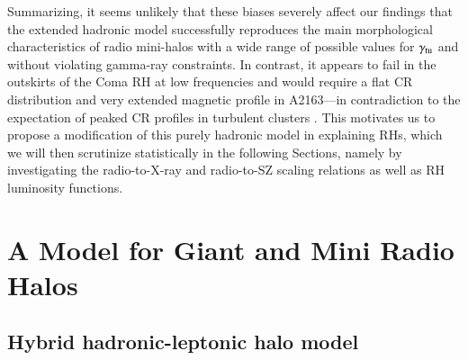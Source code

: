 \documentclass[useAMS,usenatbib]{mn2e}
\def\del#1{{}}
\begin{document}
Summarizing, it seems unlikely that these biases severely affect our findings
that the extended hadronic model successfully reproduces the main morphological
characteristics of radio mini-halos with a wide range of possible values for
$\gamma_{{\mathrm{tu}}}$ and without violating gamma-ray constraints. In contrast, it
appears to fail in the outskirts of the Coma RH at low frequencies and
would require a flat CR distribution and very extended magnetic profile in
A2163---in contradiction to the expectation of peaked CR profiles in turbulent
clusters \citep{2011A&A...527A..99E}. This motivates us to propose a
modification of this purely hadronic model in explaining RHs, which we will then
scrutinize statistically in the following Sections, namely by investigating the
radio-to-X-ray and radio-to-SZ scaling relations as well as RH
luminosity functions.


\del{
\item Gamma-ray and radio emission are complementary tools in constraining the
  CR population. While gamma-ray emission is a direct way to constrain the CR
  pressure, it is also critical in disentangling between the hadronic and
  re-acceleration model. In contrast, the information derived from the radio
  window is degenerate with the assumptions on the magnetic field
  strengths. Nevertheless, we find that RH measurements allow tighter constraints
  on the CR pressure (except for the case of Coma). 
\item The magnetic field values adopted here are perfectly in agreement with
  other observational constraints, solving previous tensions of the
  \emph{classical} hadronic model (e.g.,
  \citealp{2011ApJ...728...53J}). Indeed, different values of $B_{0}$ could be
  adopted without violating other observational constraints. The exception to
  this is again Coma, for which a higher $B_{0}$ value would be in contradiction
  with Faraday rotation measure data \citep{2010A&A...513A..30B}, leaving room
  for central magnetic field strengths around 1--5~$\mu$G that are in agreement
  with the data \citep{2012...VERITAS}. Only a value much lower would imply a
  level of the gamma-ray emission that challenges the most recent {\em Fermi}
  limit \citep{2012...VERITAS}.}


\section{A Model for Giant and Mini Radio Halos}
\label{sec:discussion_hadronic}

\subsection{Hybrid hadronic-leptonic halo model}
\end{document}
